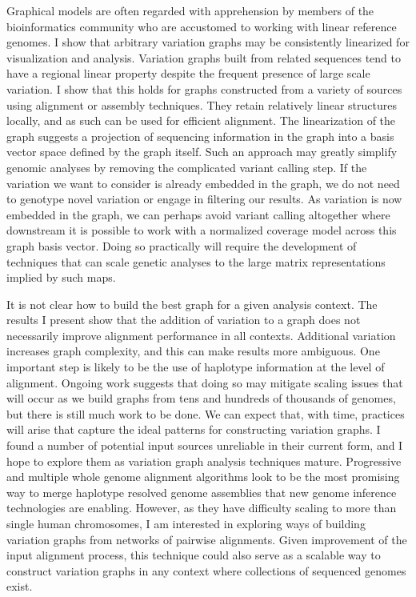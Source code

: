 \documentclass[a4paper,12pt,numbered,oneside]{Classes/PhDThesisPSnPDF}
\begin{document}
Graphical models are often regarded with apprehension by members of the bioinformatics community who are accustomed to working with linear reference genomes.
I show that arbitrary variation graphs may be consistently linearized for visualization and analysis.
Variation graphs built from related sequences tend to have a regional linear property despite the frequent presence of large scale variation.
I show that this holds for graphs constructed from a variety of sources using alignment or assembly techniques.
They retain relatively linear structures locally, and as such can be used for efficient alignment.
The linearization of the graph suggests a projection of sequencing information in the graph into a basis vector space defined by the graph itself.
Such an approach may greatly simplify genomic analyses by removing the complicated variant calling step.
If the variation we want to consider is already embedded in the graph, we do not need to genotype novel variation or engage in filtering our results.
As variation is now embedded in the graph, we can perhaps avoid variant calling altogether where downstream it is possible to work with a normalized coverage model across this graph basis vector.
Doing so practically will require the development of techniques that can scale genetic analyses to the large matrix representations implied by such maps.

It is not clear how to build the best graph for a given analysis context.
The results I present show that the addition of variation to a graph does not necessarily improve alignment performance in all contexts.
Additional variation increases graph complexity, and this can make results more ambiguous.
One important step is likely to be the use of haplotype information at the level of alignment.
Ongoing work suggests that doing so may mitigate scaling issues that will occur as we build graphs from tens and hundreds of thousands of genomes, but there is still much work to be done.
We can expect that, with time, practices will arise that capture the ideal patterns for constructing variation graphs.
I found a number of potential input sources unreliable in their current form, and I hope to explore them as variation graph analysis techniques mature.
Progressive and multiple whole genome alignment algorithms look to be the most promising way to merge haplotype resolved genome assemblies that new genome inference technologies are enabling.
However, as they have difficulty scaling to more than single human chromosomes, I am interested in exploring ways of building variation graphs from networks of pairwise alignments. 
Given improvement of the input alignment process, this technique could also serve as a scalable way to construct variation graphs in any context where collections of sequenced genomes exist.
\end{document}
